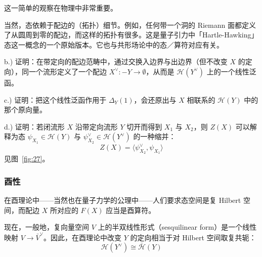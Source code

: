 
这一简单的观察在物理中非常重要。

当然，态依赖于配边的（拓扑）细节。例如，任何带一个洞的 Riemann 面都定义了从圆周到零的配边，而这样的拓扑有很多。这是量子引力中「Hartle-Hawking」态这一概念的一个原始版本。它也与共形场论中的态／算符对应有关。

\quad b.) 证明：在带定向的配边范畴中，通过交换入边界与出边界（但不改变 $X$ 的定向），同一个流形定义了一个配边 $X^\vee: -Y\to\emptyset$，从而是 $\mathcal{H}(Y^\vee)$ 上的一个线性泛函。

\quad c.) 证明：把这个线性泛函作用于 $\Delta_Y(1)$，会还原出与 $X$ 相联系的 $\mathcal{H}(Y)$ 中的那个原向量。

\quad d.) 证明：若闭流形 $X$ 沿带定向流形 $Y$ 切开而得到 $X_1$ 与 $X_2$，则 $Z(X)$ 可以解释为态 $\psi_{X_1}\in\mathcal{H}(Y)$ 与 $\psi_{X_2}^\vee\in\mathcal{H}(Y^\vee)$ 的一种缩并：
\begin{equation}
  Z(X)=\langle \psi_{X_2}^\vee,\psi_{X_1}\rangle
  \tag{5.24}
  \label{eq:5.24}
\end{equation}
见图~\ref{fig:27}。

\subsubsection{酉性} %

在酉理论中——当然也在量子力学的公理中——人们要求态空间是复 Hilbert 空间，而配边 $X$ 所对应的 $F(X)$ 应当是酉算符。

现在，一般地，复向量空间 $V$ 上的半双线性形式（sesquilinear form）是一个线性映射 $V\to\bar V^\vee$。因此，在酉理论中改变 $Y$ 的定向相当于对 Hilbert 空间取复共轭：
\begin{equation}
  \mathcal{H}(Y^\vee)\cong\bar{\mathcal{H}}(Y)
  \tag{5.25}
  \label{eq:5.25}
\end{equation}

